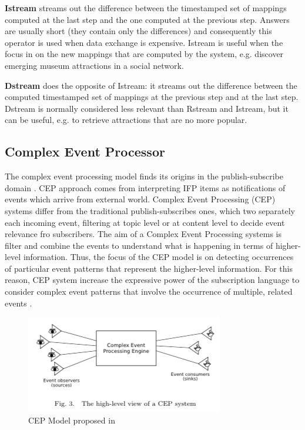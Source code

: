 \textbf{Istream} streams out the difference between the timestamped set of mappings computed at the last step and the one computed at the previous step. Answers are usually short (they contain only the differences) and consequently this operator is used when data exchange is expensive. Istream is useful when the focus in on the new mappings that are computed by the system, e.g. discover emerging museum attractions in a social network.

\textbf{Dstream} does the opposite of Istream: it streams out the difference between the computed timestamped set of mappings at the previous step and at the last step. Dstream is normally considered less relevant than Rstream and Istream, but it can be useful, e.g. to retrieve attractions that are no more popular.


\subsection{Complex Event Processor}\label{sec:cep}

The complex event processing model finds its origins in the publish-subscribe domain \cite{Eugster:2003:MFP:857076.857078}. CEP approach comes from interpreting IFP items as notifications of events which arrive from  external world. Complex Event Processing (CEP) systems differ from the traditional publish-subscribes ones, which two separately each incoming event, filtering at topic level or at content level to decide event relevance fro subscribers. The aim of a Complex Event Processing systems is filter and combine the events to understand what is happening in terms of higher-level information. Thus, the focus of the CEP model is on detecting occurrences of particular event patterns that represent the higher-level information. For this reason, CEP system increase the expressive power of the subscription language to consider complex event patterns that involve the occurrence of multiple, related events \cite{Cugola:2012:PFI:2187671.2187677}.

\begin{figure}[tbh]
  \centering
	\includegraphics[width=0.75\linewidth]{images/cep}
	\caption{CEP Model proposed in \cite{Cugola:2012:PFI:2187671.2187677}  } 
  	\label{fig:cep}
\end{figure}

